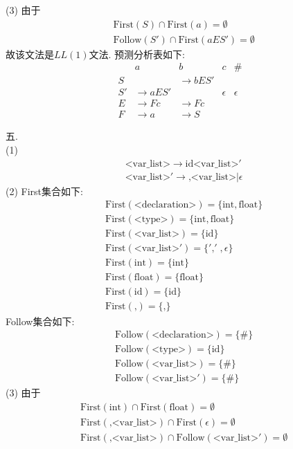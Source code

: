 \documentclass{article}
\begin{document}
(3)
由于
\begin{align*}
& \text{First}(S) \cap \text{First}(a) = \emptyset \\
& \text{Follow}(S') \cap \text{First}(aES') = \emptyset
\end{align*}
故该文法是$LL(1)$文法.
预测分析表如下:
\[
\begin{array}{|l|l|l|l|l|}
     & a & b & c & \#\\
    \hline
    S & & \to bES' & & \\
    \hline
    S' & \to aES' & & \epsilon & \epsilon \\
    \hline
    E & \to Fc & \to Fc & & \\
    \hline
    F & \to a & \to S & &
\end{array}
\]

五. \\ 
(1)
\begin{align*}
    & \text{<var\_list>} \to \text{id} \text{<var\_list>}' \\
    & \text{<var\_list>}' \to \text{,} \text{<var\_list>} | \epsilon
\end{align*}
(2)
First集合如下:
\begin{align*}
& \text{First}(\text{<declaration>}) = \{\text{int}, \text{float}\} \\
& \text{First}(\text{<type>}) = \{\text{int}, \text{float}\} \\
& \text{First}(\text{<var\_list>}) = \{\text{id}\} \\
& \text{First}(\text{<var\_list>}') = \{'\text{,}' \; , \epsilon\} \\
& \text{First}(\text{int}) = \{\text{int}\} \\
& \text{First}(\text{float}) = \{\text{float}\} \\
& \text{First}(\text{id}) = \{\text{id}\} \\
& \text{First}(\text{,}) = \{\text{,}\}
\end{align*}
Follow集合如下:
\begin{align*}
& \text{Follow}(\text{<declaration>}) = \{\# \} \\
& \text{Follow}(\text{<type>}) = \{\text{id}\} \\
& \text{Follow}(\text{<var\_list>}) = \{\# \} \\
& \text{Follow}(\text{<var\_list>}') = \{\# \}
\end{align*}
(3)
由于
\begin{align*}
& \text{First}(\text{int}) \cap \text{First}(\text{float}) = \emptyset \\
& \text{First}(\text{,<var\_list>}) \cap \text{First}(\epsilon) = \emptyset \\
& \text{First}(\text{,<var\_list>}) \cap \text{Follow}(\text{<var\_list>}') = \emptyset 
\end{align*}    
\end{document}
